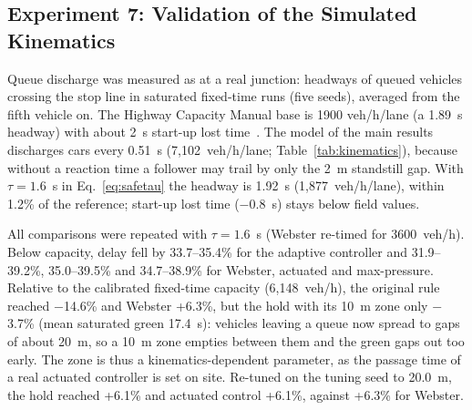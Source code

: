 \subsection{Experiment 7: Validation of the Simulated Kinematics}
\label{sec:kin}
Queue discharge was measured as at a real junction: headways of queued vehicles crossing the stop line in saturated fixed-time runs (five seeds), averaged from the fifth vehicle on. The Highway Capacity Manual base is 1900 veh/h/lane (a 1.89~s headway) with about 2~s start-up lost time~\cite{ref24}. The model of the main results discharges cars every 0.51~s (7,102~veh/h/lane; Table~\ref{tab:kinematics}), because without a reaction time a follower may trail by only the 2~m standstill gap. With $\tau = 1.6$~s in Eq.~\eqref{eq:safetau} the headway is 1.92~s (1,877~veh/h/lane), within 1.2\% of the reference; start-up lost time ($-$0.8~s) stays below field values.

\begin{table}[H]
\centering
\caption{Queue discharge against field reference values}
\label{tab:kinematics}
\small
{}
\par{}
\end{table}


All comparisons were repeated with $\tau = 1.6$~s (Webster re-timed for 3600~veh/h). Below capacity, delay fell by 33.7--35.4\% for the adaptive controller and 31.9--39.2\%, 35.0--39.5\% and 34.7--38.9\% for Webster, actuated and max-pressure. Relative to the calibrated fixed-time capacity (6,148~veh/h), the original rule reached $-$14.6\% and Webster +6.3\%, but the hold with its 10~m zone only $-$3.7\% (mean saturated green 17.4~s): vehicles leaving a queue now spread to gaps of about 20~m, so a 10~m zone empties between them and the green gaps out too early. The zone is thus a kinematics-dependent parameter, as the passage time of a real actuated controller is set on site. Re-tuned on the tuning seed to 20.0~m, the hold reached +6.1\% and actuated control +6.1\%, against +6.3\% for Webster.

